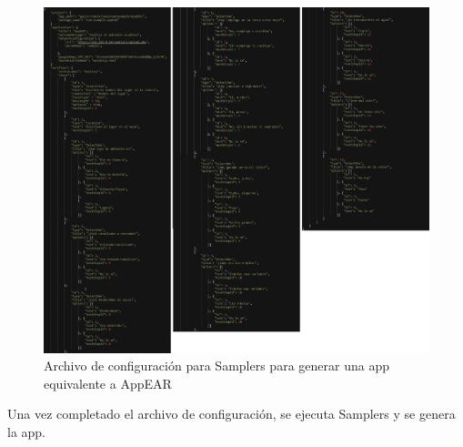 \begin{figure}[H]\label{img_archivo_configuracion_appear}
  \centering
   \includegraphics[scale=0.3]{06-caso_de_uso/archivo_configuracion.png} 
    \caption{Archivo de configuración para Samplers para generar una app equivalente a AppEAR}
\end{figure}

Una vez completado el archivo de configuración, se ejecuta Samplers y se genera la app.

